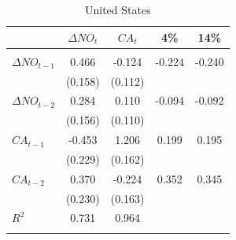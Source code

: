 \documentclass[12pt]{article}
\begin{document}
\begin{table}[h!]
\begin{center}
\caption{United States}			
\begin{threeparttable}

\begin{tabular}{lcccc}
&$ \Delta NO_{t} $        &$ CA_{t} $				 &4\%				&14\% \\
\hline \\[-1.8ex]

$ \Delta NO_{t - 1} $   & 0.466     &-0.124     &-0.224 	&-0.240	  \\
				                &(0.158)    &(0.112)    &         &         \\
$ \Delta NO_{t - 2} $   & 0.284     & 0.110     &-0.094   &-0.092   \\
				                &(0.156)    &(0.110)    &         &         \\
$ CA_{t - 1} $          &-0.453     & 1.206     & 0.199   & 0.195   \\
				                &(0.229)    &(0.162)    &         &         \\
$ CA_{t - 2} $          & 0.370     &-0.224     & 0.352   & 0.345   \\
				                &(0.230)    &(0.163)    &         &         \\
$ R^{2} $				        & 0.731	    & 0.964     &         &         \\
\hline \\[-1.8ex]


\end{tabular}


\end{threeparttable}
\end{center}
\end{table}
\end{document}
